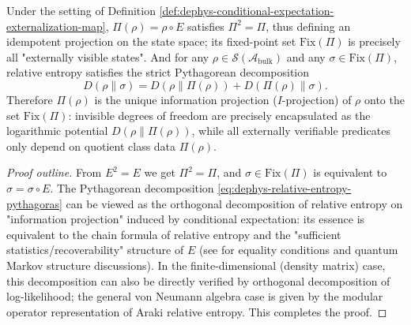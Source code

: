 \begin{theorem}\label{thm:dephys-idempotent-monad-i-projection}
Under the setting of Definition \ref{def:dephys-conditional-expectation-externalization-map}, \(\Pi(\rho)=\rho\circ E\) satisfies \(\Pi^2=\Pi\), thus defining an idempotent projection on the state space;
its fixed-point set \(\mathrm{Fix}(\Pi)\) is precisely all "externally visible states".
And for any \(\rho\in\mathcal{S}(\mathcal{A}_{\mathrm{bulk}})\) and any \(\sigma\in\mathrm{Fix}(\Pi)\), relative entropy satisfies the strict Pythagorean decomposition
\begin{equation}\label{eq:dephys-relative-entropy-pythagoras}
\boxed{\;
D(\rho\|\sigma)=D(\rho\|\Pi(\rho)) + D(\Pi(\rho)\|\sigma).\;}
\end{equation}
Therefore \(\Pi(\rho)\) is the unique information projection (\(I\)-projection) of \(\rho\) onto the set \(\mathrm{Fix}(\Pi)\):
invisible degrees of freedom are precisely encapsulated as the logarithmic potential \(D(\rho\|\Pi(\rho))\), while all externally verifiable predicates only depend on quotient class data \(\Pi(\rho)\).
\end{theorem}

\begin{proof}[Proof outline]
From \(E^2=E\) we get \(\Pi^2=\Pi\), and \(\sigma\in\mathrm{Fix}(\Pi)\) is equivalent to \(\sigma=\sigma\circ E\).
The Pythagorean decomposition \eqref{eq:dephys-relative-entropy-pythagoras} can be viewed as the orthogonal decomposition of relative entropy on "information projection" induced by conditional expectation:
its essence is equivalent to the chain formula of relative entropy and the "sufficient statistics/recoverability" structure of \(E\) (see \cite{Petz2003MonotonicityRelativeEntropyRevisited} for equality conditions and quantum Markov structure discussions).
In the finite-dimensional (density matrix) case, this decomposition can also be directly verified by orthogonal decomposition of log-likelihood; the general von Neumann algebra case is given by the modular operator representation of Araki relative entropy. This completes the proof.
\end{proof}

